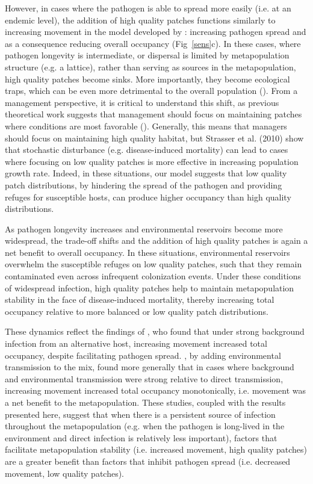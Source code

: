 \documentclass{svjour3}
\begin{document}
However, in cases where the pathogen is able to spread more easily (i.e. at an endemic level), the addition of high quality patches functions similarly to increasing movement in the model developed by \cite{Hess1996}: increasing pathogen spread and as a consequence reducing overall occupancy (Fig~\ref{sens}c).  In these cases, where pathogen longevity is intermediate, or dispersal is limited by metapopulation structure (e.g. a lattice), rather than serving as sources in the metapopulation, high quality patches become sinks.  More importantly, they become ecological traps, which can be even more detrimental to the overall population (\cite{Kristan2003}).  From a management perspective, it is critical to understand this shift, as previous theoretical work suggests that management should focus on maintaining patches where conditions are most favorable (\cite{Strasser2010}).  Generally, this means that managers should focus on maintaining high quality habitat, but Strasser et al. (2010) show that stochastic disturbance (e.g. disease-induced mortality) can lead to cases where focusing on low quality patches is more effective in increasing population growth rate.  Indeed, in these situations, our model suggests that low quality patch distributions, by hindering the spread of the pathogen and providing refuges for susceptible hosts, can produce higher occupancy than high quality distributions.  

As pathogen longevity increases and environmental reservoirs become more widespread, the trade-off shifts and the addition of high quality patches is again a net benefit to overall occupancy.  In these situations, environmental reservoirs overwhelm the susceptible refuges on low quality patches, such that they remain contaminated even across infrequent colonization events.  Under these conditions of widespread infection, high quality patches help to maintain metapopulation stability in the face of disease-induced mortality, thereby increasing total occupancy relative to more balanced or low quality patch distributions.  

These dynamics reflect the findings of \cite{Gog2002}, who found that under strong background infection from an alternative host, increasing movement increased total occupancy, despite facilitating pathogen spread.  \cite{Park2012}, by adding environmental transmission to the mix, found more generally that in cases where background and environmental transmission were strong relative to direct transmission, increasing movement increased total occupancy monotonically, i.e. movement was a net benefit to the metapopulation.  These studies, coupled with the results presented here, suggest that when there is a persistent source of infection throughout the metapopulation (e.g. when the pathogen is long-lived in the environment and direct infection is relatively less important), factors that facilitate metapopulation stability (i.e. increased movement, high quality patches) are a greater benefit than factors that inhibit pathogen spread (i.e. decreased movement, low quality patches).   
\end{document}
